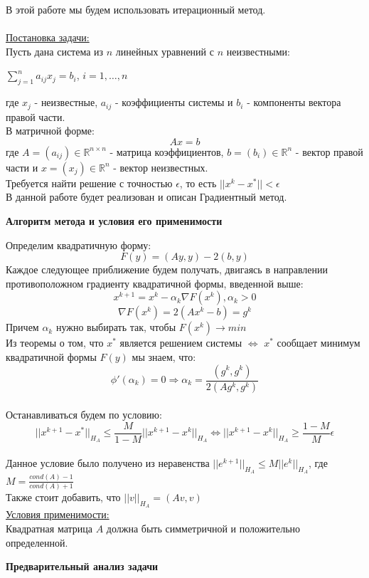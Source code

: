 \documentclass{article}
\begin{document}
	В этой работе мы будем использовать итерационный метод.\\
	\\
	\underline{Постановка задачи:}\\
	Пусть дана система из $n$ линейных уравнений с $n$ неизвестными:
	\begin{center}
		$\sum\limits_{j = 1}^n a_{ij}x_j = b_i$, $i = 1, \ldots, n$
	\end{center}
	где $x_j$ - неизвестные, $a_{ij}$ - коэффициенты системы и $b_i$ - компоненты вектора правой части.\\
	В матричной форме: $$Ax = b$$
	где $A = (a_{ij}) \in \mathbb{R} ^{n \times n}$ - матрица коэффициентов, $b = (b_i) \in \mathbb{R}^n$ - вектор правой части и $x = (x_j) \in \mathbb{R}^n$ - вектор неизвестных.\\
	Требуется найти решение с точностью $\epsilon$, то есть $||x^k - x^*|| < \epsilon$\\
	В данной работе будет реализован и описан Градиентный метод.\\
	\begin{center} \textbf{Алгоритм метода и условия его применимости}\end{center}
	Определим квадратичную форму: $$F(y) = (Ay, y) - 2(b, y)$$
	Каждое следующее приближение будем получать, двигаясь в направлении противоположном градиенту квадратичной формы, введенной выше: $$x^{k+1} = x^k - \alpha_k \nabla F(x^k), \alpha_k > 0$$
	$$\nabla F(x^k) = 2(Ax^k - b) = g^k$$
	Причем $\alpha_k$ нужно выбирать так, чтобы $F(x^k) \to min$\\
	Из теоремы о том, что $x^*$ является решением системы $\Leftrightarrow$ $x^*$ сообщает минимум квадратичной формы $F(y)$ мы знаем, что: $$\phi '(\alpha_k) = 0 \Rightarrow \alpha_k = \frac{(g^k, g^k)}{2(Ag^k, g^k)}$$\\
	Останавливаться будем по условию: $$||x^{k+1} - x^*||_{H_A} \leq \frac{M}{1-M}||x^{k+1} - x^k||_{H_A} \Leftrightarrow ||x^{k+1} - x^k||_{H_A} \geq \frac{1-M}{M} \epsilon$$\\
	Данное условие было получено из неравенства $||e^{k+1}||_{H_A} \leq M||e^k||_{H_A}$, где $M = \frac{cond(A) - 1}{cond(A) + 1}$\\
	Также стоит добавить, что $||v||_{H_A} = (Av, v)$\\
	\underline{Условия применимости:}\\
	Квадратная матрица $A$ должна быть симметричной и положительно определенной.
	\begin{center} \textbf{Предварительный анализ задачи}\end{center}
\end{document}
